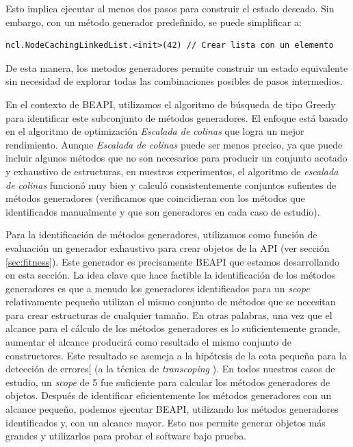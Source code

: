 \vspace{1em}

Esto implica ejecutar al menos dos pasos para construir el estado deseado. Sin embargo, con un método generador predefinido, se puede simplificar a:
\vspace{1em}

\begin{lstlisting}
ncl.NodeCachingLinkedList.<init>(42) // Crear lista con un elemento
\end{lstlisting}

De esta manera, los metodos generadores permite construir un estado equivalente sin necesidad de explorar todas las combinaciones posibles de pasos intermedios.

En el contexto de \textsf{BEAPI}, utilizamos el algoritmo de búsqueda de tipo Greedy para identificar este subconjunto de métodos generadores.
El enfoque está basado en el algoritmo de optimización \emph{Escalada de colinas} que logra un mejor rendimiento. 
Aunque \emph{Escalada de colinas} puede ser menos preciso, ya que puede incluir algunos métodos que no son necesarios para producir un conjunto acotado y exhaustivo de estructuras, 
en nuestros experimentos, el algoritmo de \emph{escalada de colinas}  funcionó muy bien y calculó consistentemente conjuntos sufientes de métodos generadores (verificamos que coincidieran con los métodos que identificados manualmente y que son generadores en cada caso de estudio). 

Para la identificación de métodos generadores, utilizamos como función de evaluación un generador exhaustivo para crear objetos de la API (ver sección \ref{sec:fitness}). 
Este generador es precisamente BEAPI que estamos desarrollando en esta sección. 
La idea clave que hace factible la identificación de los métodos generadores es que a menudo los generadores identificados para un \emph{scope} relativamente pequeño 
utilizan el mismo conjunto de métodos que se necesitan para crear estructuras de cualquier tamaño.
En otras palabras, una vez que el alcance para el cálculo de los métodos generadores es lo suficientemente grande, aumentar el alcance producirá como resultado el mismo conjunto de constructores. 
Este resultado se asemeja a la hipótesis de la cota pequeña para la detección de errores[\cite{Andoni02} (a la técnica de \emph{transcoping} \cite{Rosner13}).
En todos nuestros casos de estudio, un \emph{scope} de 5 fue suficiente para calcular los métodos generadores de objetos. 
Después de identificar eficientemente los métodos generadores con un alcance pequeño, podemos ejecutar \textsf{BEAPI}, utilizando los métodos generadores identificados y,
con un alcance mayor. Esto nos permite generar objetos más grandes y utilizarlos para probar el software bajo prueba.

